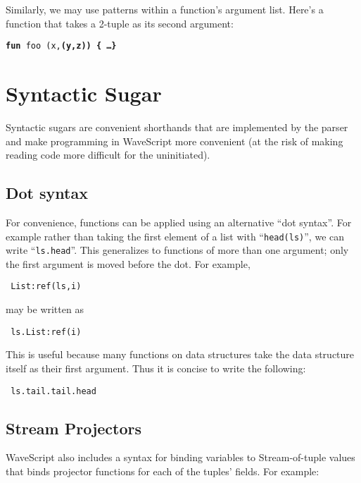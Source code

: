 \documentclass[twocolumn]{report}
\newcommand{\cd}{\tt}
\newenvironment{wscode}{\begin{center}\tt}{\end{center}}
\begin{document}
Similarly, we may use patterns within a function's argument list.  Here's
a function that takes a 2-tuple as its second argument:

\begin{center}
{\tt {\bf fun} foo (x,\bf{(y,z)}) \{ \dots \}}
\end{center}


\section{Syntactic Sugar}

Syntactic sugars are convenient shorthands that are implemented by the
parser and make programming in WaveScript more convenient (at the risk
of making reading code more difficult for the uninitiated).

\subsection{Dot syntax}
  For convenience, functions can be applied using an
alternative ``dot syntax''.  For example rather than taking the first
element of a list with ``{\cd head(ls)}'', we can write ``{\cd ls.head}''.
This generalizes to functions of more than one argument; only the
first argument is moved before the dot.  For example, 
\vspace{-2mm}
\begin{wscode}
List:ref(ls,i)
\end{wscode}
\vspace{-2mm}
 may be written as 
\vspace{-2mm}
\begin{wscode}
ls.List:ref(i)
\end{wscode}
\vspace{-2mm}
This is useful because many functions on data structures take the
data structure itself as their first argument.  Thus it is concise to
write the following:
\vspace{-2mm}
\begin{wscode}
ls.tail.tail.head
\end{wscode}
\vspace{-2mm}


\subsection{Stream Projectors}

WaveScript also includes a syntax for binding variables to
Stream-of-tuple values that binds projector functions for each of
the tuples' fields.  For example:
\end{document}
